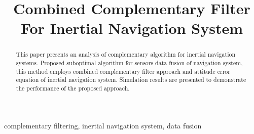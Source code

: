 \documentclass[conference, utf8]{IEEEtran}
\begin{document}
%
\title{Combined Complementary Filter For Inertial Navigation System}


\author{
\and
{}
}

\maketitle


\begin{abstract}
This paper presents an analysis of complementary algorithm for inertial 
navigation systems. Proposed suboptimal algorithm for sensors data 
fusion of navigation system, this method employs combined complementary 
filter approach and attitude error equation of inertial navigation system. 
Simulation results are presented to demonstrate the  performance of the 
proposed approach. 
\end{abstract}

\begin{IEEEkeywords}
complementary filtering, inertial navigation system, data fusion
\end{IEEEkeywords}



%
\IEEEpeerreviewmaketitle
\end{document}
